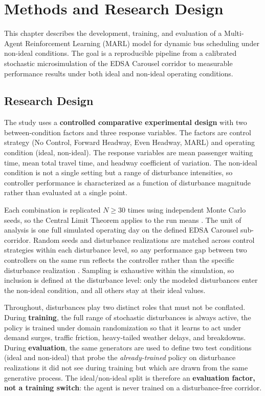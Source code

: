 \chapter{Methods and Research Design}

This chapter describes the development, training, and evaluation of a Multi-Agent Reinforcement Learning (MARL) model for dynamic bus scheduling under non-ideal conditions. The goal is a reproducible pipeline from a calibrated stochastic microsimulation of the EDSA Carousel corridor to measurable performance results under both ideal and non-ideal operating conditions.


\section{Research Design}

The study uses a \textbf{controlled comparative experimental design} with two between-condition factors and three response variables. The factors are control strategy (No Control, Forward Headway, Even Headway, MARL) and operating condition (ideal, non-ideal). The response variables are mean passenger waiting time, mean total travel time, and headway coefficient of variation. The non-ideal condition is not a single setting but a range of disturbance intensities, so controller performance is characterized as a function of disturbance magnitude rather than evaluated at a single point.

Each combination is replicated $N \geq 30$ times using independent Monte Carlo seeds, so the Central Limit Theorem applies to the run means \cite{Wasserman2004}. The unit of analysis is one full simulated operating day on the defined EDSA Carousel sub-corridor. Random seeds and disturbance realizations are matched across control strategies within each disturbance level, so any performance gap between two controllers on the same run reflects the controller rather than the specific disturbance realization \cite{Henderson2018Matters,Agarwal2021Precipice}. Sampling is exhaustive within the simulation, so inclusion is defined at the disturbance level: only the modeled disturbances enter the non-ideal condition, and all others stay at their ideal values.

Throughout, disturbances play two distinct roles that must not be conflated. During \textbf{training}, the full range of stochastic disturbances is always active, the policy is trained under domain randomization \cite{Tang2024Curriculum} so that it learns to act under demand surges, traffic friction, heavy-tailed weather delays, and breakdowns. During \textbf{evaluation}, the same generators are used to define two test conditions (ideal and non-ideal) that probe the \textit{already-trained} policy on disturbance realizations it did not see during training but which are drawn from the same generative process. The ideal/non-ideal split is therefore an \textbf{evaluation factor, not a training switch}: the agent is never trained on a disturbance-free corridor. 
\pagebreak
